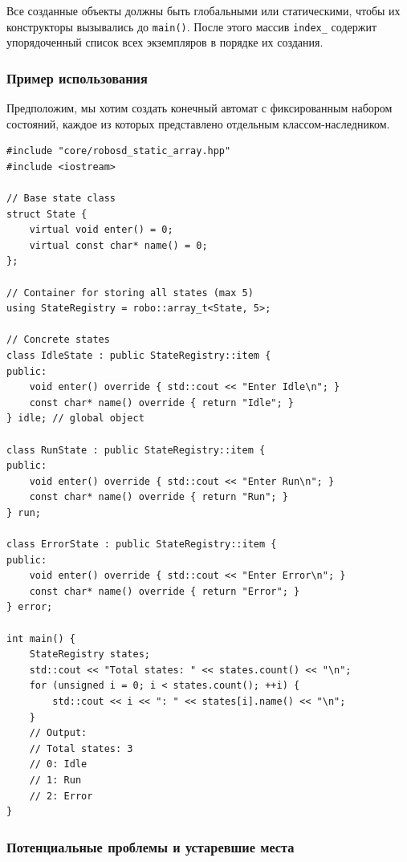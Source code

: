 \documentclass[a4paper,12pt]{article}
\begin{document}
Все созданные объекты должны быть глобальными или статическими, чтобы их конструкторы вызывались до \texttt{main()}. После этого массив \texttt{index\_} содержит упорядоченный список всех экземпляров в порядке их создания.

\subsubsection{Пример использования}

Предположим, мы хотим создать конечный автомат с фиксированным набором состояний, каждое из которых представлено отдельным классом-наследником.

\begin{lstlisting}[caption={State registry using array\_t}]
#include "core/robosd_static_array.hpp"
#include <iostream>

// Base state class
struct State {
    virtual void enter() = 0;
    virtual const char* name() = 0;
};

// Container for storing all states (max 5)
using StateRegistry = robo::array_t<State, 5>;

// Concrete states
class IdleState : public StateRegistry::item {
public:
    void enter() override { std::cout << "Enter Idle\n"; }
    const char* name() override { return "Idle"; }
} idle; // global object

class RunState : public StateRegistry::item {
public:
    void enter() override { std::cout << "Enter Run\n"; }
    const char* name() override { return "Run"; }
} run;

class ErrorState : public StateRegistry::item {
public:
    void enter() override { std::cout << "Enter Error\n"; }
    const char* name() override { return "Error"; }
} error;

int main() {
    StateRegistry states;
    std::cout << "Total states: " << states.count() << "\n";
    for (unsigned i = 0; i < states.count(); ++i) {
        std::cout << i << ": " << states[i].name() << "\n";
    }
    // Output:
    // Total states: 3
    // 0: Idle
    // 1: Run
    // 2: Error
}
\end{lstlisting}

\subsubsection{Потенциальные проблемы и устаревшие места}
\end{document}
